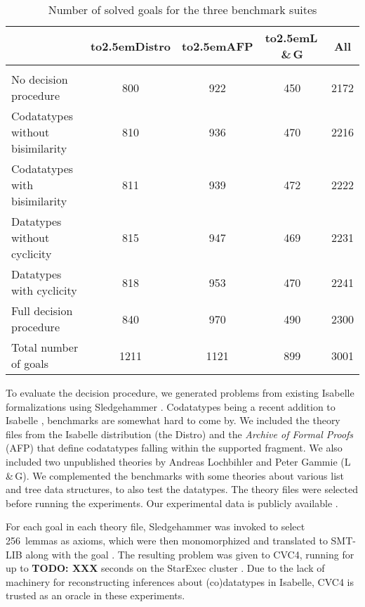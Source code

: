 \newcommand\landg{L\,\&\,G}
\newcommand\HD[1]{\hbox to2.5em{\hfill#1\hfill}}

\begin{table}[tbh!]
\begin{center}\begin{tabular}{l@{\kern1.5em}c@{\kern.5em}c@{\kern.5em}c@{\kern1.5em}c}
  & \HD{Distro} & \HD{AFP} & \HD{\landg} & All
\\[1pt] %
\midrule
\\[-9pt] %
No decision procedure
  & 800 & 922 & 450 & 2172 \\
Codatatypes without bisimilarity
  & 810 & 936 & 470 & 2216 \\
Codatatypes with bisimilarity
  & 811 & 939 & 472 & 2222 \\
Datatypes without cyclicity
  & 815 & 947 & 469 & 2231 \\
Datatypes with cyclicity
  & 818 & 953 & 470 & 2241 \\
Full decision procedure
  & 840 & 970 & 490 & 2300 \\[\jot]
Total number of goals
  & 1211\phantom{0} & 1121\phantom{0} & 899 & 3001
\end{tabular}\end{center}
\caption{Number of solved goals for the three benchmark suites}
\label{tab:bench}
\end{table}

To evaluate the decision procedure, we generated problems from existing
Isabelle formalizations using Sledgehammer \cite{paulson-blanchette-2010}.
Codatatypes being a recent addition to Isabelle
\cite{blanchette-et-al-2014-impl}, benchmarks are somewhat hard to come by. We
included the theory files from the Isabelle distribution (the Distro) and the \emph{Archive
of Formal Proofs} (AFP) \cite{klein-et-al-afp} that define codatatypes falling
within the supported fragment. We also included two unpublished theories by
Andreas Lochbihler and Peter Gammie (\landg). We complemented the benchmarks
with some theories about various list and tree data structures, to also test
the datatypes.
The theory files were selected before running the experiments.
Our experimental data is publicly available \cite{our-eval-data}.

For each goal in each theory file, Sledgehammer was invoked to select
256~lemmas as axioms, which were then monomorphized and translated to SMT-LIB
along with the goal \cite{boehme-2012-phd}. The resulting problem was given to
CVC4, running for up to \textbf{TODO: XXX} seconds on the StarExec cluster
\cite{xxx}. Due to the lack of machinery for reconstructing inferences about
(co)datatypes in Isabelle, CVC4 is trusted as an oracle in these experiments.

